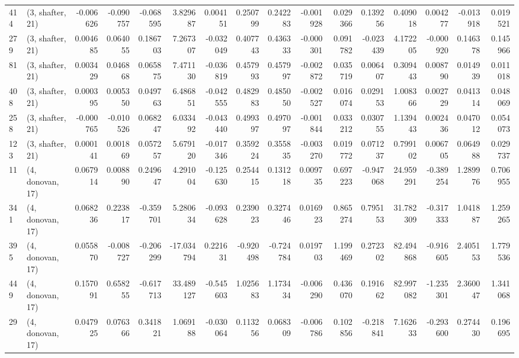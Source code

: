 \begin{tabular}{llrrrrrrrrrrrrrr}
414 &  (3, shafter, 21) &  -0.006626 & -0.090757 & -0.068595 &     3.829687 &   0.004151 &   0.250799 &   0.242283 & -0.001928 &  0.029366 &  0.139256 &    0.409018 &  0.004277 & -0.013918 &  0.019521 \\
279 &  (3, shafter, 21) &   0.004685 &  0.064055 &  0.186703 &     7.267307 &  -0.032049 &   0.407743 &   0.436333 & -0.000301 &  0.091782 & -0.023439 &    4.172205 & -0.000920 &  0.146378 &  0.145966 \\
81  &  (3, shafter, 21) &   0.003429 &  0.046868 &  0.065875 &     7.471130 &  -0.036819 &   0.457993 &   0.457997 & -0.002872 &  0.035719 &  0.006407 &    0.309443 &  0.008790 &  0.014939 &  0.011018 \\
408 &  (3, shafter, 21) &   0.000395 &  0.005350 &  0.049763 &     6.486851 &  -0.042555 &   0.482983 &   0.485050 & -0.002527 &  0.016074 &  0.029153 &    1.008366 &  0.002729 &  0.041314 &  0.048069 \\
258 &  (3, shafter, 21) &  -0.000765 & -0.010526 &  0.068247 &     6.033492 &  -0.043440 &   0.499397 &   0.497097 & -0.001844 &  0.033212 &  0.030755 &    1.139443 &  0.002436 &  0.047012 &  0.054073 \\
123 &  (3, shafter, 21) &   0.000141 &  0.001869 &  0.057257 &     5.679120 &  -0.017346 &   0.359224 &   0.355835 & -0.003270 &  0.019772 &  0.071237 &    0.799102 &  0.006705 &  0.064988 &  0.029737 \\
11  &  (4, donovan, 17) &   0.067914 &  0.008890 &  0.249647 &     4.291004 &  -0.125630 &   0.254415 &   0.131218 &  0.009735 &  0.697223 & -0.947068 &   24.959291 & -0.389254 &  1.289976 &  0.706955 \\
341 &  (4, donovan, 17) &   0.068236 &  0.223817 & -0.359701 &     5.280634 &  -0.093628 &   0.239023 &   0.327446 &  0.016923 &  0.865274 &  0.795153 &   31.782309 & -0.317333 &  1.041887 &  1.259265 \\
395 &  (4, donovan, 17) &   0.055870 & -0.008727 & -0.206299 &   -17.034794 &   0.221631 &  -0.920498 &  -0.724784 &  0.019703 &  1.199469 &  0.272302 &   82.494868 & -0.916605 &  2.405153 &  1.779536 \\
449 &  (4, donovan, 17) &   0.157091 &  0.658255 & -0.617713 &    33.489127 &  -0.545603 &   1.025683 &   1.173434 & -0.006290 &  0.436070 &  0.191662 &   82.997082 & -1.235301 &  2.360047 &  1.341068 \\
29  &  (4, donovan, 17) &   0.047925 &  0.076366 &  0.341821 &     1.069188 &  -0.030064 &   0.113256 &   0.068309 & -0.006786 &  0.102856 & -0.218841 &    7.162633 & -0.293600 &  0.274430 &  0.196695 \\

\end{tabular}
